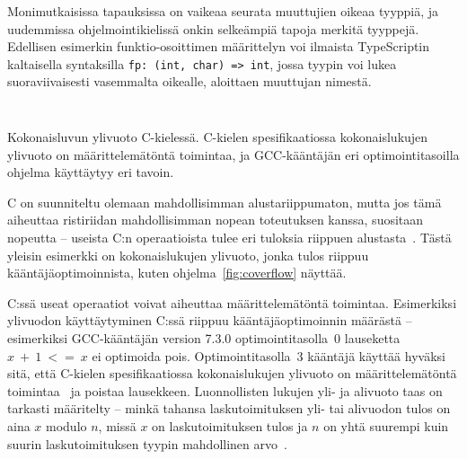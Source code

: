 Monimutkaisissa tapauksissa on vaikeaa seurata muuttujien oikeaa tyyppiä, ja
uudemmissa ohjelmointikielissä onkin selkeämpiä tapoja merkitä tyyppejä.
Edellisen esimerkin funktio-osoittimen määrittelyn voi ilmaista TypeScriptin
kaltaisella syntaksilla \texttt{fp:~(int,~char)~=>~int}, jossa tyypin voi lukea
suoraviivaisesti vasemmalta oikealle, aloittaen muuttujan nimestä.


\FloatBarrier

\begin{listing}[ht!]
    \inputminted{C}{c-overflow.c}
    \inputminted{text}{c-overflow-output.txt}

    \caption{Kokonaisluvun ylivuoto C-kielessä. C-kielen
    spesifikaatiossa kokonaislukujen ylivuoto on määrittelemätöntä toimintaa,
    ja GCC-kääntäjän eri optimointitasoilla ohjelma käyttäytyy eri tavoin.}
    \label{fig:coverflow}
\end{listing}

\FloatBarrier

C on suunniteltu olemaan mahdollisimman alustariippumaton, mutta jos tämä
aiheuttaa ristiriidan mahdollisimman nopean toteutuksen kanssa, suositaan
nopeutta -- useista C:n operaatioista tulee eri tuloksia riippuen
alustasta~\citep[liite J, luku J.3]{C18}. Tästä yleisin esimerkki on
kokonaislukujen ylivuoto, jonka tulos riippuu kääntäjäoptimoinnista, kuten
ohjelma~\ref{fig:coverflow} näyttää.

C:ssä useat operaatiot voivat aiheuttaa määrittelemätöntä
toimintaa. Esimerkiksi ylivuodon käyttäytyminen
C:ssä riippuu kääntäjäoptimoinnin määrästä -- esimerkiksi GCC-kääntäjän version
7.3.0 optimointitasolla~0 lauseketta $x~+~1~<=~x$ ei optimoida pois.
Optimointitasolla~3 kääntäjä käyttää hyväksi sitä, että \mbox{C-kielen}
spesifikaatiossa kokonaislukujen ylivuoto on määrittelemätöntä
toimintaa~\citep[liite J, luku J.2]{C18} ja poistaa lausekkeen. Luonnollisten
lukujen yli- ja alivuoto taas on tarkasti määritelty -- minkä tahansa
laskutoimituksen yli- tai alivuodon tulos on aina $x$ modulo $n$, missä $x$ on
laskutoimituksen tulos ja $n$ on yhtä suurempi kuin suurin laskutoimituksen
tyypin mahdollinen arvo~\citep[luku 6.2.5]{C18}.


